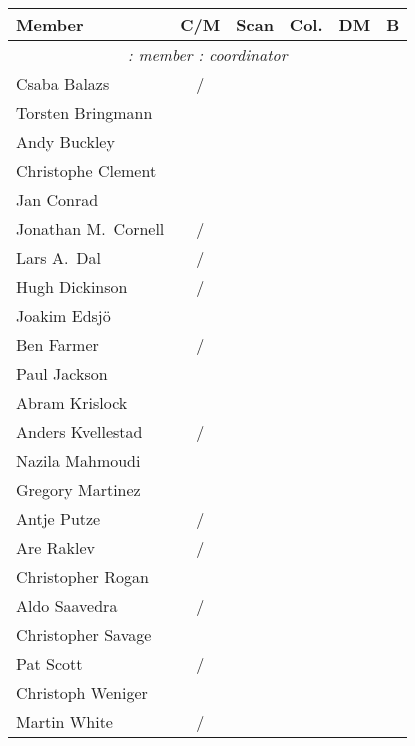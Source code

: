 \begin{center}
\renewcommand{\arraystretch}{1.25}
\begin{tabular*}{0.99\textwidth}{@{\extracolsep{\fill}}|lccccc|}
  \hline
  \textbf{Member} & \textbf{C/M}  & \textbf{Scan}
                  & \textbf{Col.} & \textbf{DM}
                  & \textbf{B} \\
  \hline
  \multicolumn{6}{|c|}{\textit{\M{}: member \hspace{3em} \C{}: coordinator}}\\
  Csaba Balazs          & \C/\C &    & \M &    &    \\
  Torsten Bringmann     &       &    &    & \C &    \\
  Andy Buckley          &       &    & \M &    &    \\
  Christophe Clement    &       &    & \M &    &    \\
  Jan Conrad            &       &    &    & \M &    \\
  Jonathan M.\ Cornell  & \E/\M &    &    & \M &    \\
  Lars A.\ Dal          & \M/\E &    &    & \M &    \\
  Hugh Dickinson        & \M/\M &    &    &    &    \\
  Joakim Edsj\"o        &       &    &    & \M &    \\
  Ben Farmer            & \M/\E & \M & \M &    &    \\
  Paul Jackson          &       &    &    &    &    \\
  Abram Krislock        &       & \M & \C &    &    \\
  Anders Kvellestad     & \M / \E &    & \M &    &    \\
  Nazila Mahmoudi       &       &    &    &    & \C \\
  Gregory Martinez      &       & \C &    &    &    \\
  Antje Putze           & \M/\E & \M &    & \M &    \\
  Are Raklev            & \E/\M &    & \M &    &    \\
  Christopher Rogan     &       &    & \M &    &    \\
  Aldo Saavedra         & \M/\M &    & \M &    &    \\
  Christopher Savage    &       & \M &    & \C &    \\
  Pat Scott             & \C/\C & \M & \M & \M &    \\
  Christoph Weniger     &       & \M &    & \C &    \\
  Martin White          & \E/\M &    & \C &    &    \\
  \hline
\end{tabular*}
\end{center}


